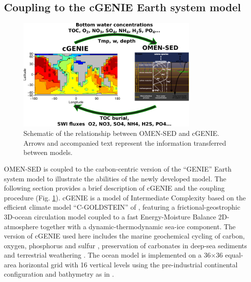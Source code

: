 \documentclass[gmd, manuscript]{copernicus}
\begin{document}
\subsection{Coupling to the cGENIE Earth system model}\label{subsubsec:Methods_ESM_coupling}
\begin{figure}[tbp]
\begin{center}
	\includegraphics[width=0.8\textwidth]{figures/OMEN-GENIE-coupling.pdf}
	\caption{Schematic of the relationship between OMEN-SED and cGENIE. Arrows and accompanied text represent the information transferred between models. }
	\label{fig:OMEN-GENIE-coupling}
	\end{center}
\end{figure}
OMEN-SED is coupled to the carbon-centric version of the ``GENIE'' Earth system model \citep[cGENIE,][]{ridgwell_marine_2007} to illustrate the abilities of the newly developed model. 
The following section provides a brief description of cGENIE and the coupling procedure (Fig. \ref{fig:OMEN-GENIE-coupling}). 
cGENIE is a model of Intermediate Complexity based on the efficient climate model ``C-GOLDSTEIN''  of \citet{edwards_uncertainties_2005}, featuring a frictional-geostrophic 3D-ocean circulation model coupled to a fast 
Energy-Moisture Balance 2D-atmosphere together with a dynamic-thermodynamic sea-ice component. 
The version of cGENIE used here includes the marine geochemical cycling of carbon, oxygen, phosphorus and sulfur \citep{ridgwell_marine_2007}, 
preservation of carbonates in deep-sea sediments \citep[SEDGEM,][]{ridgwell_regulation_2007} and terrestrial weathering \citep{colbourn_rock_2013}. 
The ocean model is implemented on a 36$\times$36 equal-area horizontal grid with 16 vertical levels using the pre-industrial continental configuration and bathymetry as in \citet{archer_atmospheric_2009}. 
\end{document}

